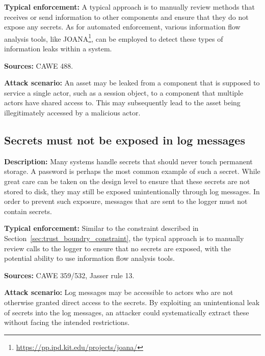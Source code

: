  \textbf{Typical enforcement:}
 A typical approach is to manually review methods that receives or send information to other components and ensure that they do not expose any secrets. As for automated enforcement, various information flow analysis tools, like JOANA\footnote{\url{https://pp.ipd.kit.edu/projects/joana/}}, can be employed to detect these types of information leaks within a system.
 
 \textbf{Sources:} CAWE 488.
 
 \textbf{Attack scenario:}
 An asset may be leaked from a component that is supposed to service a single actor, such as a session object, to a component that multiple actors have shared access to. This may subsequently lead to the asset being illegitimately accessed by a malicious actor.

\subsection{Secrets must not be exposed in log messages} 

\textbf{Description:} Many systems handle secrets that should never touch permanent storage. A password is perhaps the most common example of such a secret. While great care can be taken on the design level to ensure that these secrets are not stored to disk, they may still be exposed unintentionally through log messages. In order to prevent such exposure, messages that are sent to the logger must not contain secrets.

 \textbf{Typical enforcement:} Similar to the constraint described in Section~\ref{sec:trust_boundry_constraint}, the typical approach is to manually review calls to the logger to ensure that no secrets are exposed, with the potential ability to use information flow analysis tools.
 
 \textbf{Sources:} CAWE 359/532, Jasser rule 13.
 
 \textbf{Attack scenario:} Log messages may be accessible to actors who are not otherwise granted direct access to the secrets. By exploiting an unintentional leak of secrets into the log messages, an attacker could systematically extract these without facing the intended restrictions.